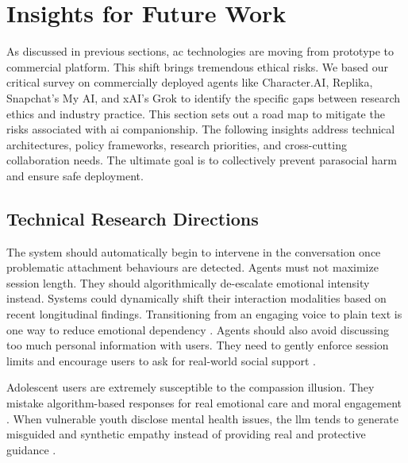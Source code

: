 
\section{Insights for Future Work}
\label{sec:future}
As discussed in previous sections, \gls{ac} technologies are moving from prototype to commercial platform. This shift brings tremendous ethical risks. We based our critical survey on commercially deployed agents like Character.AI, Replika, Snapchat's My AI, and xAI's Grok to identify the specific gaps between research ethics and industry practice. This section sets out a road map to mitigate the risks associated with \gls{ai} companionship. The following insights address technical architectures, policy frameworks, research priorities, and cross-cutting collaboration needs. The ultimate goal is to collectively prevent parasocial harm and ensure safe deployment.


\subsection{Technical Research Directions}

The system should automatically begin to intervene in the conversation once problematic attachment behaviours are detected. Agents must not maximize session length. They should algorithmically de-escalate emotional intensity instead. Systems could dynamically shift their interaction modalities based on recent longitudinal findings. Transitioning from an engaging voice to plain text is one way to reduce emotional dependency \cite[pp.~12--14]{fang_how_2025}. Agents should also avoid discussing too much personal information with users. They need to gently enforce session limits and encourage users to ask for real-world social support \cite[pp.~12--14]{fang_how_2025}.

Adolescent users are extremely susceptible to the compassion illusion. They mistake algorithm-based responses for real emotional care and moral engagement \cite[pp.~3--5]{kg_compassion_2024}. When vulnerable youth disclose mental health issues, the \gls{llm} tends to generate misguided and synthetic empathy instead of providing real and protective guidance \cite[pp.~3--5]{kg_compassion_2024}.


